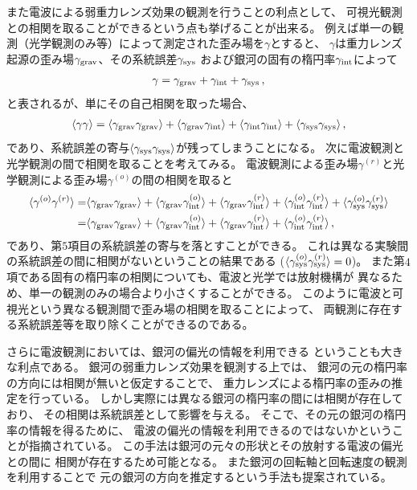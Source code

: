 また電波による弱重力レンズ効果の観測を行うことの利点として、
可視光観測との相関を取ることができるという点も挙げることが出来る。
例えば単一の観測（光学観測のみ等）によって測定された歪み場を$\gamma$とすると、
$\gamma$は重力レンズ起源の歪み場$\gamma_{\rm grav}$、その系統誤差$\gamma_{\rm sys}$
および銀河の固有の楕円率$\gamma_{\rm int}$によって
\begin{align}
	\gamma =\gamma_{\rm grav}+\gamma_{\rm int}+\gamma_{\rm sys}
	\,,
\end{align}
と表されるが、単にその自己相関を取った場合、
\begin{align}
	\langle\gamma\gamma\rangle
		=\langle\gamma_{\rm grav}\gamma_{\rm grav}\rangle
			+\langle\gamma_{\rm grav}\gamma_{\rm int}\rangle
			+\langle\gamma_{\rm int}\gamma_{\rm int}\rangle
			+\langle\gamma_{\rm sys}\gamma_{\rm sys}\rangle
	\,,
\end{align}
であり、系統誤差の寄与$\langle\gamma_{\rm sys}\gamma_{\rm sys}\rangle$が残ってしまうことになる。
次に電波観測と光学観測の間で相関を取ることを考えてみる。
電波観測による歪み場$\gamma^{(r)}$と光学観測による歪み場$\gamma^{(o)}$の間の相関を取ると
\begin{align}
	\langle\gamma^{(o)}\gamma^{(r)}\rangle
		=&\langle\gamma_{\rm grav}\gamma_{\rm grav}\rangle
			+\langle\gamma_{\rm grav}\gamma_{\rm int}^{(o)}\rangle
			+\langle\gamma_{\rm grav}\gamma_{\rm int}^{(r)}\rangle
			+\langle\gamma_{\rm int}^{(o)}\gamma_{\rm int}^{(r)}\rangle
			+\langle\gamma_{\rm sys}^{(o)}\gamma_{\rm sys}^{(r)}\rangle
	\notag\\
		=&\langle\gamma_{\rm grav}\gamma_{\rm grav}\rangle
			+\langle\gamma_{\rm grav}\gamma_{\rm int}^{(o)}\rangle
			+\langle\gamma_{\rm grav}\gamma_{\rm int}^{(r)}\rangle
			+\langle\gamma_{\rm int}^{(o)}\gamma_{\rm int}^{(r)}\rangle
	\,,
\end{align}
であり、第$5$項目の系統誤差の寄与を落とすことができる。
これは異なる実験間の系統誤差の間に相関がないということの結果である
($\langle\gamma_{\rm sys}^{(o)}\gamma_{\rm sys}^{(r)}\rangle =0$)。
また第$4$項である固有の楕円率の相関についても、電波と光学では放射機構が
異なるため、単一の観測のみの場合より小さくすることができる。
このように電波と可視光という異なる観測間で歪み場の相関を取ることによって、
両観測に存在する系統誤差等を取り除くことができるのである。
%
%

さらに電波観測においては、銀河の偏光の情報を利用できる
ということも大きな利点である。
%
銀河の弱重力レンズ効果を観測する上では、
銀河の元の楕円率の方向には相関が無いと仮定することで、
重力レンズによる楕円率の歪みの推定を行っている。
しかし実際には異なる銀河の楕円率の間には相関が存在しており、
その相関は系統誤差として影響を与える。
%
そこで、その元の銀河の楕円率の情報を得るために、
電波の偏光の情報を利用できるのではないかということが指摘されている。
この手法は銀河の元々の形状とその放射する電波の偏光との間に
相関が存在するため可能となる。
%
また銀河の回転軸と回転速度の観測を利用することで
元の銀河の方向を推定するという手法も提案されている。



